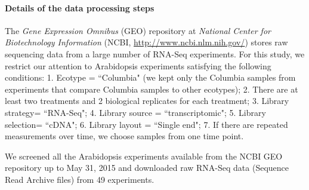 \paragraph{Details of the data processing steps}
The \textit{Gene Expression Omnibus} (GEO) repository at \textit{National
	Center for Biotechnology Information} (NCBI,
\url{http://www.ncbi.nlm.nih.gov/}) stores raw sequencing data from a large
number of RNA-Seq experiments.  For this study, we restrict our attention to
Arabidopsis experiments satisfying the following conditions: 1.  Ecotype =
``Columbia" (we kept only the Columbia samples from experiments that compare
Columbia samples to other ecotypes); 2. There are at least two treatments and 2 biological 
replicates for each
treatment; 3. Library strategy= ``RNA-Seq"; 4.
Library source = ``transcriptomic"; 5.  Library selection= ``cDNA"; 6.  Library
layout = ``Single end"; 7. If there are repeated measurements over time, we choose samples from one 
time point. 

We screened all the Arabidopsis experiments available from the NCBI
GEO repository up to May 31, 2015 and downloaded raw RNA-Seq data (Sequence Read Archive files)
from 49 experiments. %


